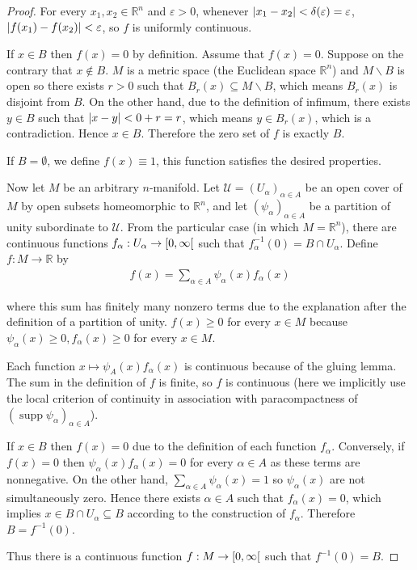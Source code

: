 \begin{proof}
	For every $x_{1}, x_{2} \in \mathbb{R}^{n}$ and $\varepsilon > 0$, whenever $\left\vert{x_{1} - x_{2}}\right\vert < \delta(\varepsilon) = \varepsilon$, $\left\vert{f(x_{1}) - f(x_{2})}\right\vert < \varepsilon$, so $f$ is uniformly continuous.

	If $x\in B$ then $f(x) = 0$ by definition. Assume that $f(x) = 0$. Suppose on the contrary that $x\notin B$. $M$ is a metric space (the Euclidean space $\mathbb{R}^{n}$) and $M\smallsetminus B$ is open so there exists $r > 0$ such that $B_{r}(x) \subseteq M\smallsetminus B$, which means $B_{r}(x)$ is disjoint from $B$. On the other hand, due to the definition of infimum, there exists $y\in B$ such that $\left\vert{x - y}\right\vert < 0 + r = r$, which means $y \in B_{r}(x)$, which is a contradiction. Hence $x\in B$. Therefore the zero set of $f$ is exactly $B$.

	If $B = \emptyset$, we define $f(x) \equiv 1$, this function satisfies the desired properties.

	Now let $M$ be an arbitrary $n$-manifold. Let $\mathscr{U} = {(U_{\alpha})}_{\alpha\in A}$ be an open cover of $M$ by open subsets homeomorphic to $\mathbb{R}^{n}$, and let ${(\psi_{\alpha})}_{\alpha\in A}$ be a partition of unity subordinate to $\mathscr{U}$. From the particular case (in which $M = \mathbb{R}^{n}$), there are continuous functions $f_{\alpha}: U_{\alpha} \to \left[{0, \infty}\right[$ such that $f_{\alpha}^{-1}(0) = B \cap U_{\alpha}$. Define $f: M\to \mathbb{R}$ by
	\begin{align*}
		f(x) = \sum_{\alpha\in A} \psi_{\alpha}(x)f_{\alpha}(x)
	\end{align*}

	where this sum has finitely many nonzero terms due to the explanation after the definition of a partition of unity. $f(x) \geq 0$ for every $x\in M$ because $\psi_{\alpha}(x) \geq 0, f_{\alpha}(x) \geq 0$ for every $x\in M$.

	Each function $x\mapsto \psi_{A}(x)f_{\alpha}(x)$ is continuous because of the gluing lemma. The sum in the definition of $f$ is finite, so $f$ is continuous (here we implicitly use the local criterion of continuity in association with paracompactness of ${(\operatorname{supp}\psi_{\alpha})}_{\alpha\in A}$).

	If $x\in B$ then $f(x) = 0$ due to the definition of each function $f_{\alpha}$. Conversely, if $f(x) = 0$ then $\psi_{\alpha}(x)f_{\alpha}(x) = 0$ for every $\alpha\in A$ as these terms are nonnegative. On the other hand, $\sum_{\alpha\in A}\psi_{\alpha}(x) = 1$ so $\psi_{\alpha}(x)$ are not simultaneously zero. Hence there exists $\alpha\in A$ such that $f_{\alpha}(x) = 0$, which implies $x \in B\cap U_{\alpha} \subseteq B$ according to the construction of $f_{\alpha}$. Therefore $B = f^{-1}(0)$.

	Thus there is a continuous function $f: M \to \left[{0, \infty}\right[$ such that $f^{-1}(0) = B$.
\end{proof}

